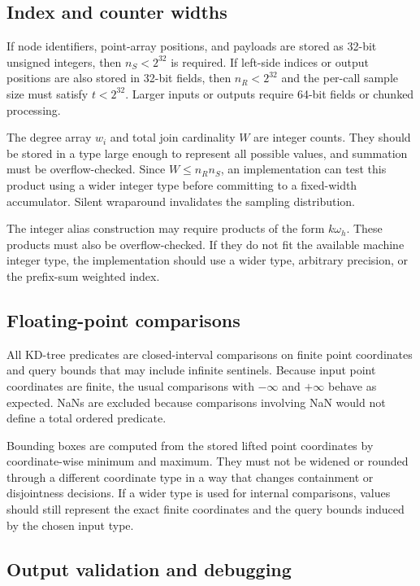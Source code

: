 \documentclass[11pt]{article}
\theoremstyle{definition}
\theoremstyle{plain}
\theoremstyle{remark}
\begin{document}
\subsection{Index and counter widths}

If node identifiers, point-array positions, and payloads are stored as 32-bit unsigned
integers, then $n_S<2^{32}$ is required.  If left-side indices or output positions are also
stored in 32-bit fields, then $n_R<2^{32}$ and the per-call sample size must satisfy
$t<2^{32}$.  Larger inputs or outputs require 64-bit fields or chunked processing.

The degree array $w_i$ and total join cardinality $W$ are integer counts.  They should be
stored in a type large enough to represent all possible values, and summation must be
overflow-checked.  Since $W\le n_Rn_S$, an implementation can test this product using a
wider integer type before committing to a fixed-width accumulator.  Silent wraparound
invalidates the sampling distribution.

The integer alias construction may require products of the form $k\omega_h$.  These products
must also be overflow-checked.  If they do not fit the available machine integer type, the
implementation should use a wider type, arbitrary precision, or the prefix-sum weighted
index.

\subsection{Floating-point comparisons}

All KD-tree predicates are closed-interval comparisons on finite point coordinates and query
bounds that may include infinite sentinels.  Because input point coordinates are finite, the
usual comparisons with $-\infty$ and $+\infty$ behave as expected.  NaNs are excluded because
comparisons involving NaN would not define a total ordered predicate.

Bounding boxes are computed from the stored lifted point coordinates by coordinate-wise
minimum and maximum.  They must not be widened or rounded through a different coordinate type
in a way that changes containment or disjointness decisions.  If a wider type is used for
internal comparisons, values should still represent the exact finite coordinates and the
query bounds induced by the chosen input type.

\subsection{Output validation and debugging}
\end{document}
